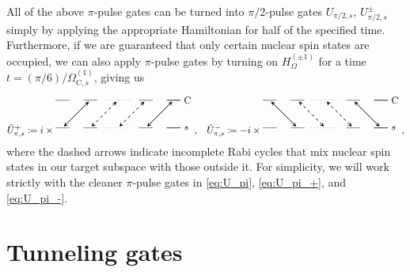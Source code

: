 \documentclass[aps,nofootinbib,notitlepage,11pt]{revtex4-1}
\newcommand{\p}[1]{\left(#1\right)} %
\newcommand{\C}{\text{C}}
\newcommand{\1}{\mathds{1}}
\begin{document}
All of the above $\pi$-pulse gates can be turned into $\pi/2$-pulse
gates $U_{\pi/2,s}$, $U_{\pi/2,s}^\pm$ simply by applying the
appropriate Hamiltonian for half of the specified time.  Furthermore,
if we are guaranteed that only certain nuclear spin states are
occupied, we can also apply $\pi$-pulse gates by turning on
$H_\Omega^{(\pm1)}$ for a time $t=\p{\pi/6}/\Omega_{\C,s}^{(1)}$,
giving us
\begin{align}
  \tilde U_{\pi,s}^+
  \coloneqq i \times
  \begin{tikzpicture}[
    scale=0.5,
    trans/.style={thick,<->,shorten >=2pt,shorten <=2pt,>=stealth}
    ]
    \draw (0,0) -- (1,0);
    \draw (2,0) -- (3,0);
    \draw[dotted] (3.5,0) -- (5.5,0);
    \draw (6,0) -- (7,0);
    \draw (8,0) -- (9,0);
    \draw (8,0) -- (9,0) node[right] {$\C$};
    \draw (0,-2) -- (1,-2);
    \draw (2,-2) -- (3,-2);
    \draw[dotted] (3.5,-2) -- (5.5,-2);
    \draw (6,-2) -- (7,-2);
    \draw (8,-2) -- (9,-2);
    \draw (8,-2) -- (9,-2) node[right] {$s$};
    \draw[trans] (2.5,0) -- (0.5,-2);
    \draw[trans, dashed] (4.5,0) -- (2.5,-2);
    \draw[trans, dashed] (6.5,0) -- (4.5,-2);
    \draw[trans] (8.5,0) -- (6.5,-2);
  \end{tikzpicture},
  &&
  \tilde U_{\pi,s}^-
  \coloneqq -i \times
  \begin{tikzpicture}[
    scale=0.5,
    trans/.style={thick,<->,shorten >=2pt,shorten <=2pt,>=stealth}
    ]
    \draw (0,0) -- (1,0);
    \draw (2,0) -- (3,0);
    \draw[dotted] (3.5,0) -- (5.5,0);
    \draw (6,0) -- (7,0);
    \draw (8,0) -- (9,0);
    \draw (8,0) -- (9,0) node[right] {$\C$};
    \draw (0,-2) -- (1,-2);
    \draw (2,-2) -- (3,-2);
    \draw[dotted] (3.5,-2) -- (5.5,-2);
    \draw (6,-2) -- (7,-2);
    \draw (8,-2) -- (9,-2);
    \draw (8,-2) -- (9,-2) node[right] {$s$};
    \draw[trans] (2.5,-2) -- (0.5,0);
    \draw[trans, dashed] (4.5,-2) -- (2.5,0);
    \draw[trans, dashed] (6.5,-2) -- (4.5,0);
    \draw[trans] (8.5,-2) -- (6.5,0);
  \end{tikzpicture},
\end{align}
where the dashed arrows indicate incomplete Rabi cycles that mix nuclear
spin states in our target subspace with those outside it.  For
simplicity, we will work strictly with the cleaner $\pi$-pulse gates
in \eqref{eq:U_pi}, \eqref{eq:U_pi_+}, and \eqref{eq:U_pi_-}.


\section{Tunneling gates}
\label{sec:tunneling}
\end{document}
